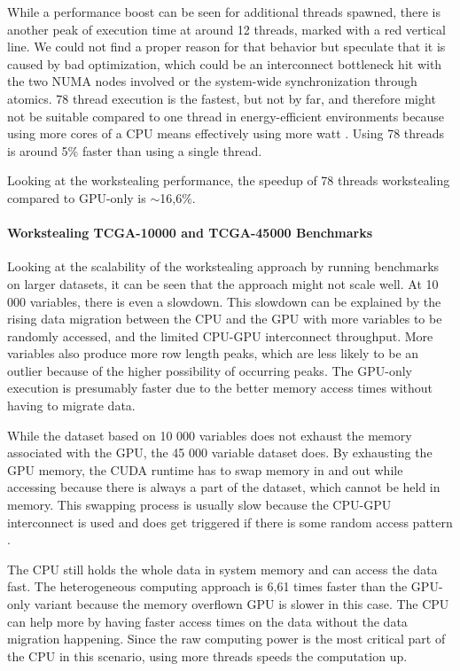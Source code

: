 While a performance boost can be seen for additional threads spawned, there is another peak of execution time at around 12 threads, marked with a red vertical line. We could not find a proper reason for that behavior but speculate that it is caused by bad optimization, which could be an interconnect bottleneck hit with the two NUMA nodes involved or the system-wide synchronization through atomics. 78 thread execution is the fastest, but not by far, and therefore might not be suitable compared to one thread in energy-efficient environments because using more cores of a CPU means effectively using more watt \cite{saravananStudyFactorsInfluencing2011}. Using 78 threads is around 5\% faster than using a single thread.

Looking at the workstealing performance, the speedup of 78 threads workstealing compared to GPU-only is $\sim$16,6\%.

\paragraph{Workstealing TCGA-10000 and TCGA-45000 Benchmarks}


Looking at the scalability of the workstealing approach by running benchmarks on larger datasets, it can be seen that the approach might not scale well. At 10 000 variables, there is even a slowdown. This slowdown can be explained by the rising data migration between the CPU and the GPU with more variables to be randomly accessed, and the limited CPU-GPU interconnect throughput. More variables also produce more row length peaks, which are less likely to be an outlier because of the higher possibility of occurring peaks.
The GPU-only execution is presumably faster due to the better memory access times without having to migrate data.

While the dataset based on 10 000 variables does not exhaust the memory associated with the GPU, the 45 000 variable dataset does. By exhausting the GPU memory, the CUDA runtime has to swap memory in and out while accessing because there is always a part of the dataset, which cannot be held in memory. This swapping process is usually slow because the CPU-GPU interconnect is used and does get triggered if there is some random access pattern \cite{gangulyAdaptivePageMigration2020, kimBatchAwareUnifiedMemory}.

The CPU still holds the whole data in system memory and can access the data fast. The heterogeneous computing approach is 6,61 times faster than the GPU-only variant because the memory overflown GPU is slower in this case. The CPU can help more by having faster access times on the data without the data migration happening.
Since the raw computing power is the most critical part of the CPU in this scenario, using more threads speeds the computation up.

